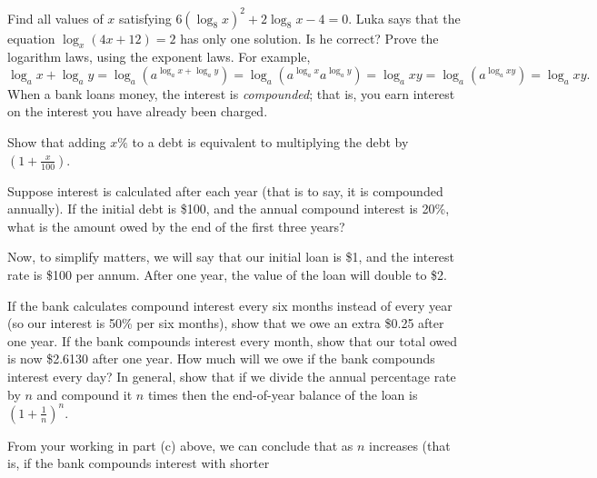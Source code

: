 \begin{questions}
  \question Find all values of $ x $ satisfying $ 6(\log_8 x)^2 + 2 \log_8 x - 4 = 0 $.
  \question Luka says that the equation $ \log_x (4x + 12) = 2 $ has only one solution. Is he correct?
  \question Prove the logarithm laws, using the exponent laws. For example,
            \begin{displaymath}
              \log_a x + \log_a y = \log_a (a^{\log_a x + \log_a y}) = \log_a (a^{\log_a x}a^{\log_a y}) = \log_a xy = \log_ a (a^{\log_a xy}) = \log_a xy.
            \end{displaymath}
  \question When a bank loans money, the interest is \emph{compounded}; that is, you earn interest on the interest you have already
            been charged.
    \begin{parts}
      \item Show that adding $ x\% $ to a debt is equivalent to multiplying the debt by $ (1 + \frac{x}{100}) $.
      \item Suppose interest is calculated after each year (that is to say, it is compounded annually). If the initial
            debt is \$100, and the annual compound interest is 20\%, what is the amount owed by the end of the first three years?
      \item Now, to simplify matters, we will say that our initial loan is \$1, and the interest rate is \$100 per annum. After
            one year, the value of the loan will double to \$2.
        \begin{subparts}
          \subpart If the bank calculates compound interest every six months instead of every year (so our interest is 50\% per
                   six months), show that we owe an extra \$0.25 after one year.
          \subpart If the bank compounds interest every month, show that our total owed is now \$2.6130 after one year.
          \subpart How much will we owe if the bank compounds interest every day?
          \subpart In general, show that if we divide the annual percentage rate by $ n $ and compound it $ n $ times then the end-of-year
                   balance of the loan is $ (1 + \frac{1}{n})^n $.
        \end{subparts}
      \item From your working in part (c) above, we can conclude that as $ n $ increases (that is, if the bank compounds interest with shorter

\end{parts}
\end{questions}
